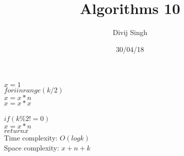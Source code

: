 \documentclass{article}
\title{Algorithms 10}
\author{Divij Singh}
\date{30/04/18}
\begin{document}
	\maketitle
	
	\section{}

	$x=1$\\
	$for i in range (k/2)$\\
		$x=x*n$\\
	$x=x*x$\\
	\\
	$if (k\%2!=0)$\\
		$x=x*n$\\
	$return x$\\

	Time complexity: $O(log k)$\\
	Space complexity: $x+n+k$
	
\end{document}
